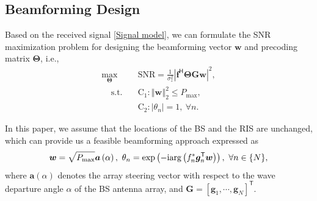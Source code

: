 \documentclass[journal,twocolumn]{IEEEtran}
\theoremstyle{nonumberplain}
\def \T {\bm \Theta}
\def \exp {\text{exp}}
\def \arg {\text{arg}}
\def \T {^{\mathsf{T}}}
\def \H {^{\mathsf{H}}}
\def \ri {{\rm i}}
\begin{document}
\subsection{Beamforming Design}
        \label{Beamforming design}
        Based on the received signal \eqref{Signal model}, we can formulate the \ac{SNR} maximization problem for designing the beamforming vector $\bm w$ and precoding matrix $\bm \Theta$, i.e.,
        \begin{subequations}
            \label{optimization}
            \begin{align}
            \label{objective}
                \max_{\bm \Theta}~~&\text{SNR}=\frac{1}{\sigma_{z}^{2}}
                \left\vert
                \bm f\H\bm \Theta\bm G\bm w \right\vert^{2},\\
            \label{constraint}
                ~~~~~\text{s.t.~~~}&\text{C}_{1}: \left\Vert \bm w\right\Vert_{2}^{2}\leq P_{\text{max}},\\
                &\text{C}_{2}: \left\vert\theta_{n}\right\vert=1,~\forall n.
            \end{align}
        \end{subequations}
        
    In this paper, we assume that the locations of the \ac{BS} and the RIS are unchanged, which can provide us a feasible beamforming approach expressed as
    \begin{equation}
        \label{traditional beamforming}
        \bm w=\sqrt{P_{\rm max}}\bm a\left(\alpha\right),~ \theta_{n} = \exp\left(-\ri \arg\left(f_{n}^{*}\bm g_{n}\T \bm w\right)\right),~\forall n\in \{N\},
    \end{equation}
    where $\bm a(\alpha)$ denotes the array steering vector with respect to the wave departure angle $\alpha$ of the BS antenna array, and $\bm G = \left[\bm g_{1}, \cdots, \bm g_{N}\right]\T$. 
\end{document}
